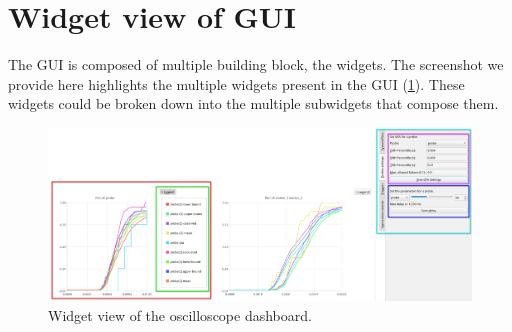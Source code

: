 \newpage

\section{Widget view of GUI} \label{app:dash_wid}
    The GUI is composed of multiple building block, the widgets. The screenshot we provide here highlights the multiple widgets present in the GUI (\cref{fig:osc_widgs}). These widgets could be broken down into the multiple subwidgets that compose them.

    \begin{figure}[H]
        \begin{center}
            \includegraphics[width = \textwidth]{img/example_osc.png}
        \end{center}
        \caption{Widget view of the oscilloscope dashboard.}
        \label{fig:osc_widgs}
    \end{figure}


